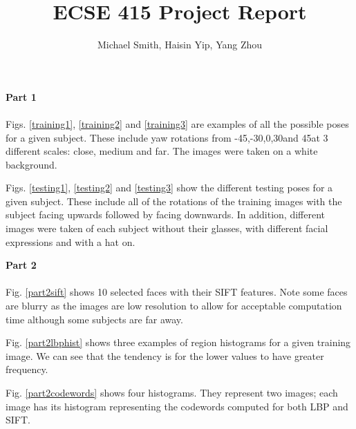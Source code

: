 \documentclass[10pt,letterpaper]{article}
\author{Michael Smith, Haisin Yip, Yang Zhou}
\title{ECSE 415 Project Report}
\begin{document}
\maketitle

\textbf{Part 1}
\paragraph{}
Figs. \ref{training1}, \ref{training2} and \ref{training3} are examples of all the possible poses for a given subject.  These include yaw rotations from -45\degree,-30\degree,0\degree,30\degree and 45\degree at 3 different scales: close, medium and far.  The images were taken on a white background.

Figs. \ref{testing1}, \ref{testing2} and \ref{testing3} show the different testing poses for a given subject.  These include all of the rotations of the training images with the subject facing upwards followed by facing downwards.  In addition, different images were taken of each subject without their glasses, with different facial expressions and with a hat on.

\vspace{5mm}
\textbf{Part 2}
\paragraph{}
Fig. \ref{part2sift} shows 10 selected faces with their SIFT features. Note some faces are blurry as the images are low resolution to allow for acceptable computation time although some subjects are far away.

Fig. \ref{part2lbphist} shows three examples of region histograms for a given training image.  We can see that the tendency is for the lower values to have greater frequency.

Fig. \ref{part2codewords} shows four histograms.  They represent two images; each image has its histogram representing the codewords computed for both LBP and SIFT.
\end{document}
